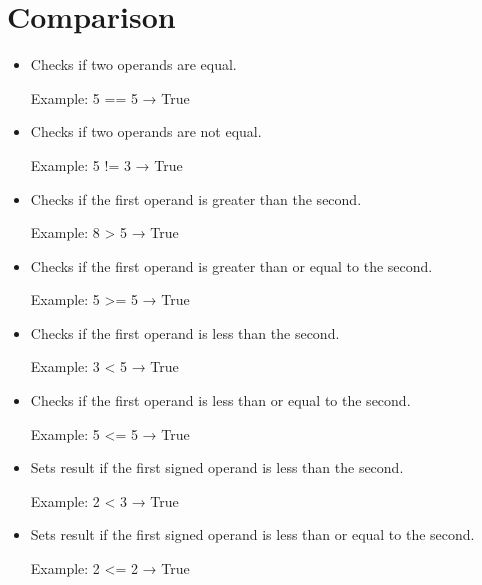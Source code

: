 \documentclass[letterpaper,10pt,english]{sphinxmanual}
\begin{document}
\section{Comparison}
\label{\detokenize{alu_operations:comparison}}\begin{itemize}
\item {} 
\sphinxAtStartPar
{} \sphinxhyphen{} Checks if two operands are equal.

\sphinxAtStartPar
Example: 5 == 5 → True

\item {} 
\sphinxAtStartPar
{} \sphinxhyphen{} Checks if two operands are not equal.

\sphinxAtStartPar
Example: 5 != 3 → True

\item {} 
\sphinxAtStartPar
{} \sphinxhyphen{} Checks if the first operand is greater than the second.

\sphinxAtStartPar
Example: 8 > 5 → True

\item {} 
\sphinxAtStartPar
{} \sphinxhyphen{} Checks if the first operand is greater than or equal to the second.

\sphinxAtStartPar
Example: 5 >= 5 → True

\item {} 
\sphinxAtStartPar
{} \sphinxhyphen{} Checks if the first operand is less than the second.

\sphinxAtStartPar
Example: 3 < 5 → True

\item {} 
\sphinxAtStartPar
{} \sphinxhyphen{} Checks if the first operand is less than or equal to the second.

\sphinxAtStartPar
Example: 5 <= 5 → True

\item {} 
\sphinxAtStartPar
{} \sphinxhyphen{} Sets result if the first signed operand is less than the second.

\sphinxAtStartPar
Example: \sphinxhyphen{}2 < 3 → True

\item {} 
\sphinxAtStartPar
{} \sphinxhyphen{} Sets result if the first signed operand is less than or equal to the second.

\sphinxAtStartPar
Example: \sphinxhyphen{}2 <= \sphinxhyphen{}2 → True

\end{itemize}
\end{document}
